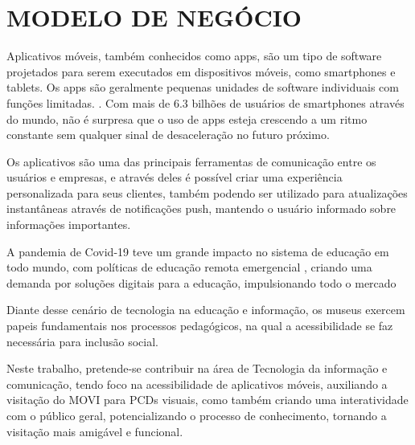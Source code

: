 \chapter{MODELO DE NEGÓCIO}
\label{cap:ModNego}



Aplicativos móveis, também conhecidos como apps, são um tipo de software projetados para serem executados em dispositivos móveis, como smartphones e tablets. Os apps são geralmente pequenas unidades de software individuais com funções limitadas. \cite{Techopedia}.
Com mais de 6.3 bilhões de usuários de smartphones \cite{Buildfire} através do mundo, não é surpresa que o uso de apps esteja crescendo a um ritmo constante sem qualquer sinal de desaceleração no futuro próximo.

Os aplicativos são uma das principais ferramentas de comunicação entre os usuários e empresas, e através deles é possível criar uma experiência personalizada para seus clientes, também podendo ser utilizado para atualizações instantâneas através de notificações push, mantendo o usuário informado sobre informações importantes. 

A pandemia de Covid-19 teve um grande impacto no sistema de educação em todo mundo, com políticas de educação remota emergencial \cite{MEC:Covid}, criando uma demanda por soluções digitais para a educação, impulsionando todo o mercado

Diante desse cenário de tecnologia na educação e informação, os museus exercem papeis fundamentais nos processos pedagógicos, na qual a acessibilidade se faz necessária para inclusão social.

Neste trabalho, pretende-se contribuir na área de Tecnologia da informação e comunicação, tendo foco na acessibilidade de aplicativos móveis, auxiliando a visitação do MOVI para PCDs visuais, como também criando uma interatividade com o público geral, potencializando o processo de conhecimento, tornando a visitação mais amigável e funcional.


